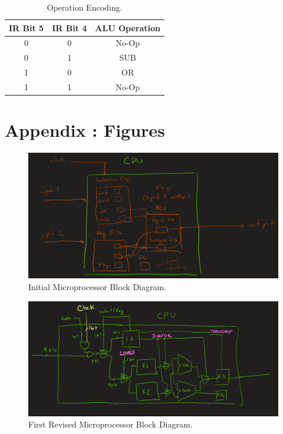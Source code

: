 \documentclass{article}
\begin{document}
\begin{table}[h!]
    \centering
    \begin{tabular}{|c|c||c|} 
        \hline
        IR Bit 5 & IR Bit 4 & ALU Operation \\
        \hline
        \hline
        0 & 0 & No-Op \\
        \hline
        0 & 1 & SUB \\
        \hline
        1 & 0 & OR \\
        \hline
        1 & 1 & No-Op \\
        \hline
    \end{tabular}
    \caption{Operation Encoding.}
    \label{tab:optenc}
\end{table}

\newpage

\section{Appendix : Figures}

\begin{figure}[ht!]
    \centering
    \includegraphics[width=\textwidth]{./_img/Block_Diagram_v0.PNG}
    \caption{Initial Microprocessor Block Diagram.}
    \label{fig:block0}
\end{figure}

\begin{figure}[ht!]
    \centering
    \includegraphics[width=\textwidth]{./_img/Block_Diagram_v1.PNG}
    \caption{First Revised Microprocessor Block Diagram.}
    \label{fig:block1}
\end{figure}
\end{document}
